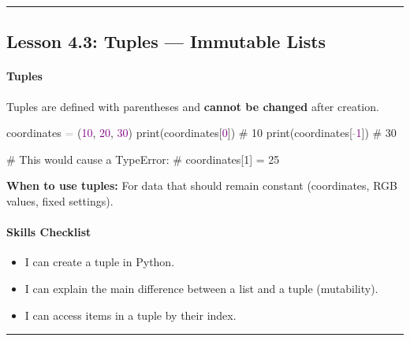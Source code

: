 \documentclass[
  justified,
  openright,
]{tufte-book}
\let\subsubsection\paragraph
\let\paragraph\paragraph
\newcommand{\BuiltInTok}[1]{#1}
\newcommand{\CommentTok}[1]{\textcolor{MidGray}{#1}}
\newcommand{\DecValTok}[1]{\textcolor{Purple}{#1}}
\newcommand{\NormalTok}[1]{#1}
\newcommand{\OperatorTok}[1]{\textcolor{DarkGray}{#1}}
\newenvironment{Shaded}{%
  \begin{snugshade}
}{%
  \end{snugshade}
}
\let\subsubsection\paragraph
\let\paragraph\paragraph
\providecommand{\tightlist}{%
  \setlength{\itemsep}{0pt}\setlength{\parskip}{0pt}}
\begin{document}
\begin{center}\rule{0.5\linewidth}{0.5pt}\end{center}

\subsection{Lesson 4.3: Tuples --- Immutable
Lists}\label{lesson-4.3-tuples-immutable-lists}

\subsubsection{Tuples}\label{tuples}

Tuples are defined with parentheses and \textbf{cannot be changed} after
creation.

\begin{Shaded}
\begin{Highlighting}[]
\NormalTok{coordinates }\OperatorTok{=}\NormalTok{ (}\DecValTok{10}\NormalTok{, }\DecValTok{20}\NormalTok{, }\DecValTok{30}\NormalTok{)}
\BuiltInTok{print}\NormalTok{(coordinates[}\DecValTok{0}\NormalTok{])     }\CommentTok{\# 10}
\BuiltInTok{print}\NormalTok{(coordinates[}\OperatorTok{{-}}\DecValTok{1}\NormalTok{])    }\CommentTok{\# 30}

\CommentTok{\# This would cause a TypeError:}
\CommentTok{\# coordinates[1] = 25}
\end{Highlighting}
\end{Shaded}

\textbf{When to use tuples:} For data that should remain constant
(coordinates, RGB values, fixed settings).

\subsubsection{Skills Checklist}\label{skills-checklist-19}

\begin{itemize}
\tightlist
\item[$\square$]
  I can create a tuple in Python.
\item[$\square$]
  I can explain the main difference between a list and a tuple
  (mutability).
\item[$\square$]
  I can access items in a tuple by their index.
\end{itemize}

\begin{center}\rule{0.5\linewidth}{0.5pt}\end{center}
\end{document}
